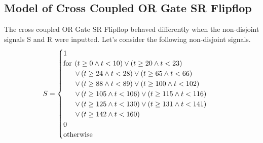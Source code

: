 \documentclass[10pt,journal]{IEEEtran}
\begin{document}
\subsection{Model of Cross Coupled OR Gate SR Flipflop}
The cross coupled OR Gate SR Flipflop behaved differently when      the non-disjoint signals S and R were inputted. Let's consider the following     non-disjoint signals.
\begin{equation}
 \begin{minipage}{250pt}
\begin{flushleft} $\displaystyle S = \begin{cases} 1 & \\  \text{for}\: \left(t \geq 0 \wedge t < 10\right) \vee \left(t \geq 20 \wedge t <23 \right) \\ \quad \ \  \vee \left(t \geq 24 \wedge t < 28\right) \vee \left(t \geq 65 \wedge t <66 \right) \\ \quad \ \  \vee \left(t \geq 88 \wedge t < 89\right) \vee \left(t \geq 100 \wedge t < 102\right) \\ \quad \ \  \vee \left(t \geq 105 \wedge t < 106\right) \vee \left(t \geq 115 \wedge t < 116\right) \\ \quad \ \  \vee \left(t \geq 125 \wedge t < 130\right) \vee \left(t \geq 131 \wedge t < 141\right) \\ \quad \ \  \vee \left(t \geq 142 \wedge t < 160\right) \\0 & \\  \text{otherwise} \end{cases}$  \end{flushleft}
 \end{minipage}
 \end{equation}
\end{document}

